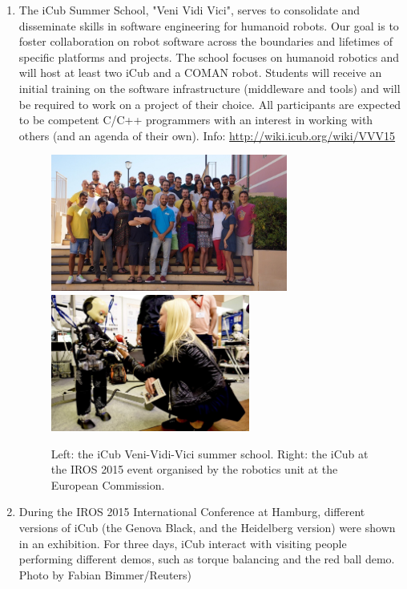 \begin{enumerate}

\item The iCub Summer School, "Veni Vidi Vici", serves to consolidate and disseminate skills in software engineering for humanoid robots. Our goal is to foster collaboration on robot software across the boundaries and lifetimes of specific platforms and projects.
The school focuses on humanoid robotics and will host at least two iCub and a COMAN robot. Students will receive an initial training on the software infrastructure (middleware and tools) and will be required to work on a project of their choice. All participants are expected to be competent C/C++ programmers with an interest in working with others (and an agenda of their own). Info: \url{http://wiki.icub.org/wiki/VVV15}

\begin{figure}[!t]
	\begin{center}
		\includegraphics[height=4.5cm]{images/vvv.jpg}
		\includegraphics[height=4.5cm]{images/iros.jpg}
		\caption{Left: the iCub Veni-Vidi-Vici summer school. Right: the iCub at the IROS 2015 event organised by the robotics unit at the European Commission.}
		\label{fig:vvv}
	\end{center}
\end{figure}

\item During the IROS 2015 International Conference at Hamburg, different versions of iCub (the Genova Black, and the Heidelberg version) were shown in an exhibition. For three days, iCub interact with visiting people performing different demos, such as torque balancing and the red ball demo. Photo by Fabian Bimmer/Reuters)



\end{enumerate}

